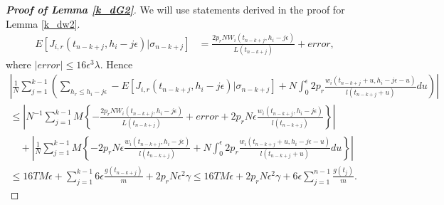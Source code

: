 \documentclass[12pt]{article}
\numberwithin{equation}{section}  %
\begin{document}

\begin{proof}[\textbf{Proof of Lemma \ref{k_dG2}}]
We will use statements derived in the proof for Lemma \ref{k_dw2}.
\begin{align*} 
E[J_{i,r}(t_{n-k+j},h_i-j\epsilon)|\sigma_{n-k+j}]&=
\frac{2p_r N W_{i}(t_{n-k+j},h_i-j\epsilon)}{L(t_{n-k+j})}+error,
\end{align*} 
where $|error|\leq 16\epsilon^3\lambda$. Hence 
{\footnotesize
\begin{align*} 
\left|\frac{1}{N}\sum_{j=1}^{k-1} \left(\sum_{h_r\leq h_i-j\epsilon}
-E[J_{i,r}(t_{n-k+j},h_i-j\epsilon)|\sigma_{n-k+j}]+
N \int_{0}^{\epsilon}2 p_r\frac{w_i(t_{n-k+j}+u,h_i-j\epsilon-u)}{l(t_{n-k+j}+u)}du\right)
\right|\\
\leq \left|
  N^{-1} \sum_{j=1}^{k-1} M
\left\{-
\frac{2p_r N W_{i}(t_{n-k+j},h_i-j\epsilon)}{L(t_{n-k+j})}+error+2 p_r N\epsilon \frac{w_i(t_{n-k+j},h_i-j\epsilon)}{l(t_{n-k+j})}
\right\}
\right|\quad\quad\quad\quad\quad\quad\\
\quad+\left|
\frac{1}{N}\sum_{j=1}^{k-1} M
\left\{
-2 p_r N\epsilon \frac{w_i(t_{n-k+j},h_i-j\epsilon)}{l(t_{n-k+j})}+
N \int_{0}^{\epsilon}2 p_r\frac{w_i(t_{n-k+j}+u,h_i-j\epsilon-u)}{l(t_{n-k+j}+u)}du
\right\}
\right|\quad\quad\quad\\
\leq 16 T M \epsilon+\sum_{j=1}^{k-1}6\epsilon \frac{g(t_{n-k+j})}{m}
+2p_r N \epsilon^2 \gamma\leq 16 T M \epsilon+2p_r N \epsilon^2 \gamma +6\epsilon\sum_{j=1}^{n-1} \frac{g(t_{j})}{m}.\quad\quad\quad\quad\quad\quad\quad\quad
\end{align*}}
\end{proof}
\end{document}
